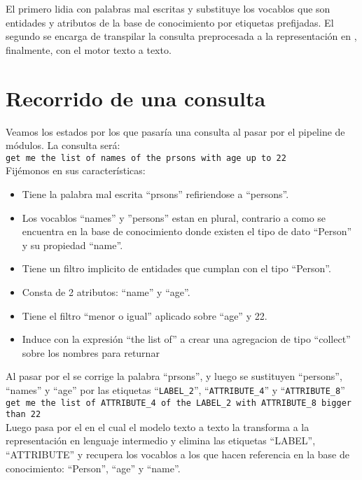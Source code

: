 El primero lidia con palabras mal escritas y substituye los vocablos que son entidades y atributos de la base de conocimiento por etiquetas prefijadas. El segundo se encarga de transpilar la consulta preprocesada a la representaci\'on en , finalmente, con el motor texto a texto.\\


\section{Recorrido de una consulta}
\label{consulta}
Veamos los estados por los que pasar\'ia una consulta al pasar por el pipeline de m\'odulos. La consulta ser\'a:\\

\verb|get me the list of names of the prsons with age up to 22|\\

Fij\'emonos en sus caracter\'isticas:\\
\begin{itemize}
    \item Tiene la palabra mal escrita ``prsons'' refiriendose a ``persons''.
    \item Los vocablos ``names'' y ''persons'' estan en plural, contrario a como se encuentra en la base de conocimiento donde existen el tipo de dato ``Person'' y su propiedad ``name''.
    \item Tiene un filtro implicito de entidades que cumplan con el tipo ``Person''.
    \item Consta de 2 atributos: ``name'' y ``age''.
    \item Tiene el filtro ``menor o igual'' aplicado sobre ``age'' y 22.
    \item Induce con la expresi\'on ``the list of'' a crear una agregacion de tipo ``collect'' sobre los nombres para returnar
\end{itemize}

Al pasar por el  se corrige la palabra ``prsons'', y luego se sustituyen ``persons'', ``names'' y ``age'' por las etiquetas ``\verb|LABEL_2|'', ``\verb|ATTRIBUTE_4|'' y ``\verb|ATTRIBUTE_8|''\\

\verb|get me the list of ATTRIBUTE_4 of the LABEL_2 with ATTRIBUTE_8 bigger than 22|\\

Luego pasa por el  en el cual el modelo texto a texto la transforma a la representaci\'on en lenguaje intermedio y elimina las etiquetas ``LABEL'', ``ATTRIBUTE'' y recupera los vocablos a los que hacen referencia en la base de conocimiento: ``Person'', ``age'' y ``name''.\\

